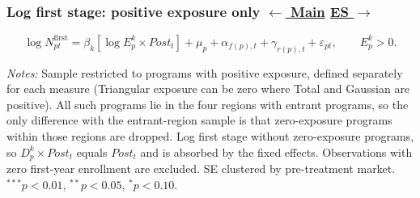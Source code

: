 \documentclass{beamer}
\begin{document}
\begin{frame}[label=sua-fs-log-positive]

\frametitle{
    Log first stage: positive exposure only
    \hfill
    \hyperlink{sua-log-first-stage}{\scriptsize\color{blue}$\leftarrow$ Main}
    \hyperlink{sua-es-log-positive}{\scriptsize\color{blue}ES $\rightarrow$}
}

\centering

\vspace{-0.2cm}

{\small
\begin{equation*}
\log N^{\mathrm{first}}_{pt}
=
\beta_k\left[\log E_p^k\times Post_t\right]
+\mu_p+\alpha_{f(p),t}+\gamma_{r(p),t}+\varepsilon_{pt},
\qquad E_p^k>0.
\end{equation*}
}

\vspace{-0.3cm}

\resizebox{0.62\textwidth}{!}{}

\vspace{0.05cm}

\parbox{0.97\textwidth}{%
\tiny
\textit{Notes:}
Sample restricted to programs with positive exposure, defined separately for each measure (Triangular exposure can be zero where Total and Gaussian are positive). All such programs lie in the four regions with entrant programs, so the only difference with the entrant-region sample is that zero-exposure programs within those regions are dropped.
Log first stage without zero-exposure programs, so $D_p^k\times Post_t$ equals $Post_t$ and is absorbed by the fixed effects. Observations with zero first-year enrollment are excluded. SE clustered by pre-treatment market.
$^{***}p<0.01$, $^{**}p<0.05$, $^{*}p<0.10$.
}

\end{frame}
\end{document}
